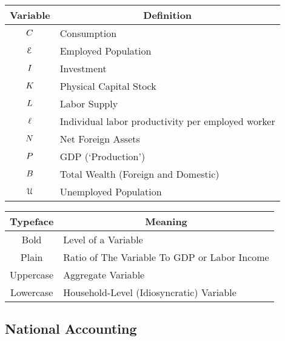 \documentclass[titlepage,abstract,letterpaper]{econtex}
\begin{document}
\begin{center}
\begin{tabular}{|c|l|} \hline
 Variable & \multicolumn{1}{|c|}{Definition}  \\ \hline
 $C$ & Consumption \\
 $\mathcal{E}$ & Employed Population \\
 $I$ & Investment \\
 $K$ & Physical Capital Stock \\
 $L$ & Labor Supply \\
 $\ell$ & Individual labor productivity per employed worker \\
 $N$ & Net Foreign Assets \\
 $P$ & GDP (`Production') \\
 $B$ & Total Wealth (Foreign and Domestic) \\
 $\mathcal{U}$ & Unemployed Population \\
\hline
\end{tabular}
\end{center}

\begin{center}
\begin{tabular}{|c|l|} \hline
 Typeface & \multicolumn{1}{c|}{Meaning}  \\ \hline
 Bold & Level of a Variable \\
 Plain    & Ratio of The Variable To GDP or Labor Income  \\
 Uppercase & Aggregate Variable \\
 Lowercase    & Household-Level (Idiosyncratic) Variable  \\
\hline
\end{tabular}
\end{center}

\subsection{National Accounting}
\label{NatAc}
\end{document}
